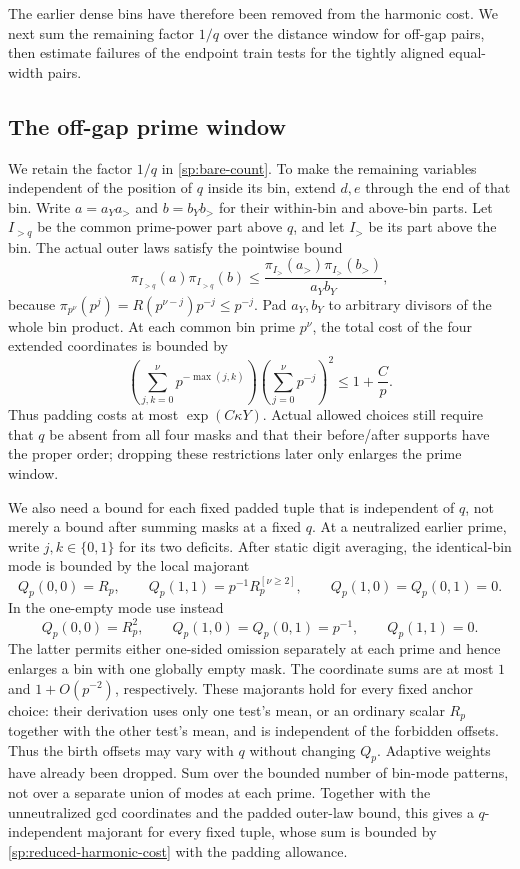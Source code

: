The earlier dense bins have therefore been removed from the harmonic
cost.  We next sum the remaining factor $1/q$ over the distance window
for off-gap pairs, then estimate failures of the endpoint train tests
for the tightly aligned equal-width pairs.

\subsection{The off-gap prime window}

We retain the factor $1/q$ in \eqref{sp:bare-count}.  To make the
remaining variables independent of the position of $q$ inside its bin,
extend $d,e$ through the end of that bin.  Write $a=a_Ya_>$ and
$b=b_Yb_>$ for their within-bin and above-bin parts.  Let $I_{>q}$
be the common prime-power part above $q$, and let $I_>$ be its part
above the bin.  The actual outer laws
satisfy the pointwise bound
\[
 \pi_{I_{>q}}(a)\pi_{I_{>q}}(b)
 \le \frac{\pi_{I_>}(a_>)\pi_{I_>}(b_>)}{a_Yb_Y},
\]
because $\pi_{p^\nu}(p^j)=R(p^{\nu-j})p^{-j}\le p^{-j}$.
Pad $a_Y,b_Y$ to arbitrary divisors of the whole bin product.  At
each common bin prime $p^\nu$, the total cost of the four extended
coordinates is bounded by
\[
 \left(\sum_{j,k=0}^{\nu}p^{-\max(j,k)}\right)
 \left(\sum_{j=0}^{\nu}p^{-j}\right)^2
 \le 1+\frac Cp.
\]
Thus padding costs at most $\exp(C\kappa Y)$.  Actual allowed
choices still require that $q$ be absent from all four masks and
that their before/after supports have the proper order; dropping
these restrictions later only enlarges the prime window.

We also need a bound for each fixed padded tuple that is independent
of $q$, not merely a bound after summing masks at a fixed $q$.
At a neutralized earlier prime, write $j,k\in\{0,1\}$ for its two
deficits.  After static digit averaging, the identical-bin mode is
bounded by the local majorant
\[
 Q_p(0,0)=R_p,\qquad
 Q_p(1,1)=p^{-1}R_p^{[\nu\ge2]},\qquad
 Q_p(1,0)=Q_p(0,1)=0.
\]
In the one-empty mode use instead
\[
 Q_p(0,0)=R_p^2,\qquad
 Q_p(1,0)=Q_p(0,1)=p^{-1},\qquad Q_p(1,1)=0.
\]
The latter permits either one-sided omission separately at each
prime and hence enlarges a bin with one globally empty mask.
The coordinate sums are at most $1$ and $1+O(p^{-2})$, respectively.
These majorants hold for every fixed anchor choice: their derivation
uses only one test's mean, or an ordinary scalar $R_p$ together with the other
test's mean, and is independent of the forbidden offsets.  Thus
the birth offsets may vary with $q$ without changing $Q_p$.
Adaptive weights have already been dropped.  Sum over the bounded
number of bin-mode patterns, not over a separate union of modes at
each prime.  Together with the unneutralized gcd coordinates and
the padded outer-law bound, this gives a $q$-independent majorant
for every fixed tuple, whose sum is bounded by
\eqref{sp:reduced-harmonic-cost} with the padding allowance.

